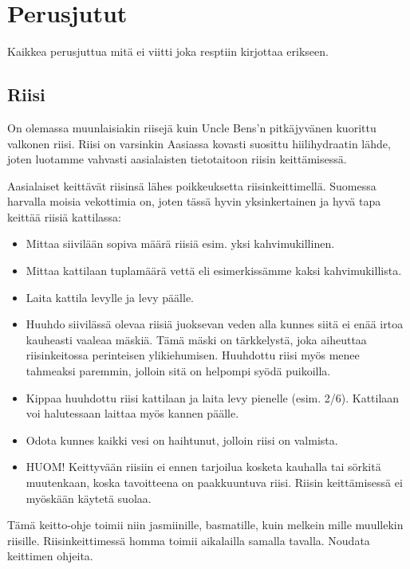 \documentclass[../keittiokirja.tex]{subfiles}
\begin{document}
\chapter{Perusjutut}
\label{chp:perusjutut}

Kaikkea perusjuttua mitä ei viitti joka resptiin kirjottaa erikseen.

\section{Riisi}

On olemassa muunlaisiakin riisejä kuin Uncle Bens'n pitkäjyvänen kuorittu valkonen riisi. 
Riisi on varsinkin Aasiassa kovasti suosittu hiilihydraatin lähde, joten luotamme vahvasti 
aasialaisten tietotaitoon riisin keittämisessä.

Aasialaiset keittävät riisinsä lähes poikkeuksetta riisinkeittimellä. Suomessa harvalla moisia 
vekottimia on, joten tässä hyvin yksinkertainen ja hyvä tapa keittää riisiä kattilassa:

\begin{itemize}
	\item Mittaa siivilään sopiva määrä riisiä esim. yksi kahvimukillinen.
	\item Mittaa kattilaan tuplamäärä vettä eli esimerkissämme kaksi kahvimukillista.
	\item Laita kattila levylle ja levy päälle.
	\item Huuhdo siivilässä olevaa riisiä juoksevan veden alla kunnes siitä ei enää irtoa 
	kauheasti vaaleaa mäskiä. Tämä mäski on tärkkelystä, joka aiheuttaa riisinkeitossa perinteisen 
	ylikiehumisen. Huuhdottu riisi myös menee tahmeaksi paremmin, jolloin sitä on helpompi syödä 
	puikoilla.
	\item Kippaa huuhdottu riisi kattilaan ja laita levy pienelle (esim. 2/6). Kattilaan voi 
	halutessaan laittaa myös kannen päälle. 
	\item Odota kunnes kaikki vesi on haihtunut, jolloin riisi on valmista.
	\item HUOM! Keittyvään riisiin ei ennen tarjoilua kosketa kauhalla tai sörkitä muutenkaan,
	koska tavoitteena on paakkuuntuva riisi. Riisin keittämisessä ei myöskään käytetä suolaa.
\end{itemize}

Tämä keitto-ohje toimii niin jasmiinille, basmatille, kuin melkein mille muullekin riisille. 
Riisinkeittimessä homma toimii aikalailla samalla tavalla. Noudata keittimen ohjeita.
\end{document}
